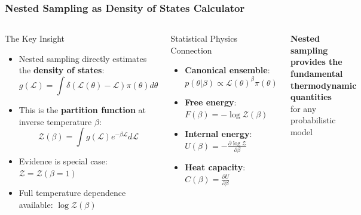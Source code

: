 \documentclass[aspectratio=169]{beamer}
\begin{document}
\begin{frame}
    \frametitle{Nested Sampling as Density of States Calculator}
    \begin{columns}
        \begin{block}{The Key Insight}
            \begin{itemize}
                \item Nested sampling directly estimates the \textbf{density of states}:
                    \[ g(\mathcal{L}) = \int \delta(\mathcal{L}(\theta) - \mathcal{L}) \pi(\theta) d\theta \]
                \item This is the \textbf{partition function} at inverse temperature $\beta$:
                    \[ \mathcal{Z}(\beta) = \int g(\mathcal{L}) e^{-\beta \mathcal{L}} d\mathcal{L} \]
                \item Evidence is special case: $\mathcal{Z} = \mathcal{Z}(\beta=1)$
                \item Full temperature dependence available: $\log \mathcal{Z}(\beta)$
            \end{itemize}
        \end{block}
        \begin{block}{Statistical Physics Connection}
            \begin{itemize}
                \item \textbf{Canonical ensemble}: $p(\theta|\beta) \propto \mathcal{L}(\theta)^\beta \pi(\theta)$
                \item \textbf{Free energy}: $F(\beta) = -\log \mathcal{Z}(\beta)$
                \item \textbf{Internal energy}: $U(\beta) = -\frac{\partial \log \mathcal{Z}}{\partial \beta}$
                \item \textbf{Heat capacity}: $C(\beta) = \frac{\partial U}{\partial \beta}$
            \end{itemize}
        \end{block}
        \vspace{10pt}
        \begin{center}
            \textbf{Nested sampling provides the fundamental thermodynamic quantities}\\
            for any probabilistic model
        \end{center}
    \end{columns}
\end{frame}
\end{document}
